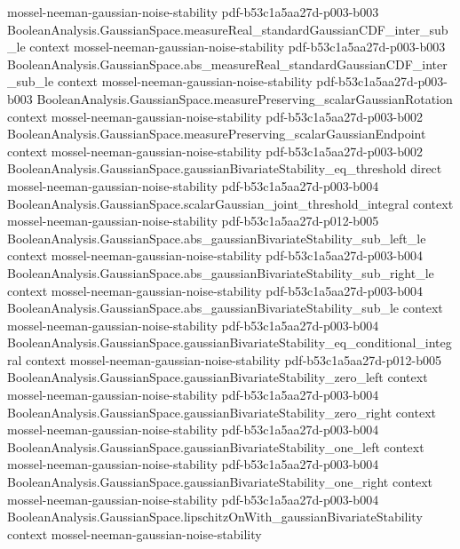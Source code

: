 \begin{lemma}
  {mossel-neeman-gaussian-noise-stability}
  {pdf-b53c1a5aa27d-p003-b003}
\proofstep
  {BooleanAnalysis.GaussianSpace.measureReal_standardGaussianCDF_inter_sub_le}
  {context}
  {mossel-neeman-gaussian-noise-stability}
  {pdf-b53c1a5aa27d-p003-b003}
\proofstep
  {BooleanAnalysis.GaussianSpace.abs_measureReal_standardGaussianCDF_inter_sub_le}
  {context}
  {mossel-neeman-gaussian-noise-stability}
  {pdf-b53c1a5aa27d-p003-b003}
\proofstep
  {BooleanAnalysis.GaussianSpace.measurePreserving_scalarGaussianRotation}
  {context}
  {mossel-neeman-gaussian-noise-stability}
  {pdf-b53c1a5aa27d-p003-b002}
\proofstep
  {BooleanAnalysis.GaussianSpace.measurePreserving_scalarGaussianEndpoint}
  {context}
  {mossel-neeman-gaussian-noise-stability}
  {pdf-b53c1a5aa27d-p003-b002}
\proofstep
  {BooleanAnalysis.GaussianSpace.gaussianBivariateStability_eq_threshold}
  {direct}
  {mossel-neeman-gaussian-noise-stability}
  {pdf-b53c1a5aa27d-p003-b004}
\proofstep
  {BooleanAnalysis.GaussianSpace.scalarGaussian_joint_threshold_integral}
  {context}
  {mossel-neeman-gaussian-noise-stability}
  {pdf-b53c1a5aa27d-p012-b005}
\proofstep
  {BooleanAnalysis.GaussianSpace.abs_gaussianBivariateStability_sub_left_le}
  {context}
  {mossel-neeman-gaussian-noise-stability}
  {pdf-b53c1a5aa27d-p003-b004}
\proofstep
  {BooleanAnalysis.GaussianSpace.abs_gaussianBivariateStability_sub_right_le}
  {context}
  {mossel-neeman-gaussian-noise-stability}
  {pdf-b53c1a5aa27d-p003-b004}
\proofstep
  {BooleanAnalysis.GaussianSpace.abs_gaussianBivariateStability_sub_le}
  {context}
  {mossel-neeman-gaussian-noise-stability}
  {pdf-b53c1a5aa27d-p003-b004}
\proofstep
  {BooleanAnalysis.GaussianSpace.gaussianBivariateStability_eq_conditional_integral}
  {context}
  {mossel-neeman-gaussian-noise-stability}
  {pdf-b53c1a5aa27d-p012-b005}
\proofstep
  {BooleanAnalysis.GaussianSpace.gaussianBivariateStability_zero_left}
  {context}
  {mossel-neeman-gaussian-noise-stability}
  {pdf-b53c1a5aa27d-p003-b004}
\proofstep
  {BooleanAnalysis.GaussianSpace.gaussianBivariateStability_zero_right}
  {context}
  {mossel-neeman-gaussian-noise-stability}
  {pdf-b53c1a5aa27d-p003-b004}
\proofstep
  {BooleanAnalysis.GaussianSpace.gaussianBivariateStability_one_left}
  {context}
  {mossel-neeman-gaussian-noise-stability}
  {pdf-b53c1a5aa27d-p003-b004}
\proofstep
  {BooleanAnalysis.GaussianSpace.gaussianBivariateStability_one_right}
  {context}
  {mossel-neeman-gaussian-noise-stability}
  {pdf-b53c1a5aa27d-p003-b004}
\proofstep
  {BooleanAnalysis.GaussianSpace.lipschitzOnWith_gaussianBivariateStability}
  {context}
  {mossel-neeman-gaussian-noise-stability}

\end{lemma}
